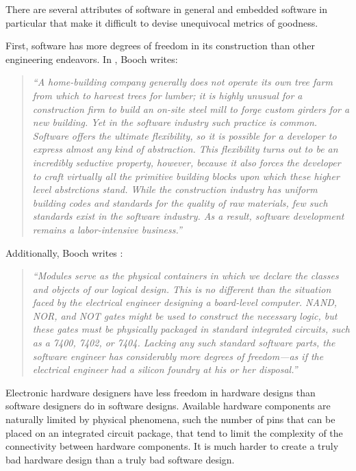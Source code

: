 There are several attributes of software in general and embedded
software in particular that make it difficult to devise unequivocal
metrics of goodness.

First, software has more degrees of freedom in its construction
than other engineering endeavors.
In \cite[p. 6]{bibref:b:boochoodwithapps}, Booch  writes:

\begin{quote}
\emph{``A home-building
company generally does not operate its own tree farm from which to harvest trees
for lumber; it is highly unusual for a construction firm to build an
on-site steel mill to forge custom girders for a new building.  Yet in the
software industry such practice is common.  Software offers the ultimate
flexibility, so it is possible for a developer to express almost any kind
of abstraction.  This flexibility turns out to be an incredibly seductive
property, however, because it also forces the developer to craft virtually
all the primitive building blocks upon which these higher level abstrctions
stand.  While the construction industry has uniform building codes and 
standards for the quality of raw materials, few such standards exist in the
software industry.  As a result, software development remains a labor-intensive
business.''}
\end{quote}

Additionally,  Booch writes \cite[p. 51]{bibref:b:boochoodwithapps}:

\begin{quote}
\emph{``Modules serve as the physical containers in which we declare the classes and
objects of our logical design.  This is no different than the situation faced
by the electrical engineer designing a board-level computer.  NAND, NOR, and 
NOT gates might be used to construct the necessary logic, but these gates
must be physically packaged in standard integrated circuits, such as a 7400,
7402, or 7404.  Lacking any such standard software parts, the software engineer
has considerably more degrees of freedom---as if the electrical engineer had
a silicon foundry at his or her disposal.''}
\end{quote}

Electronic hardware designers have less freedom in hardware designs than software
designers do in software designs.  Available hardware components are
naturally limited by physical phenomena, such the number of pins
that can be placed on an integrated circuit package, that tend to
limit the complexity of the connectivity between hardware components.
It is much harder
to create a truly bad hardware design than a truly bad software design.

